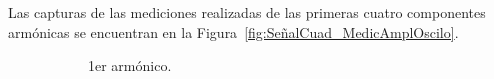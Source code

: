       Las capturas de las mediciones realizadas de las primeras cuatro componentes armónicas
      se encuentran en la Figura~\ref{fig:SeñalCuad_MedicAmplOscilo}.

      \begin{figure}[H]
        \centering
        \begin{subfigure}[H]{0.40\textwidth}
          \caption{1er armónico.}
        \end{subfigure}
        \hfill 
        \begin{subfigure}[H]{0.40\textwidth}

\end{subfigure}
\end{figure}
